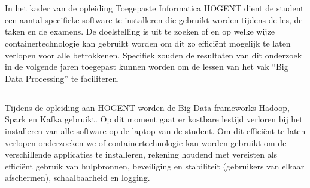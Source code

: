 
\chapter{}%
\label{ch:inleiding}

In het kader van de opleiding Toegepaste Informatica HOGENT dient de student een aantal specifieke software te installeren die gebruikt worden tijdens de les, de taken en de examens.
De doelstelling is uit te zoeken of en op welke wijze containertechnologie kan gebruikt worden om dit zo efficiënt mogelijk te laten verlopen voor alle betrokkenen. Specifiek zouden de resultaten van dit onderzoek in de volgende jaren toegepast kunnen worden om de lessen van het vak ``Big Data Processing'' te faciliteren.

\section{}%
\label{sec:probleemstelling}
Tijdens de opleiding aan HOGENT worden de Big Data frameworks Hadoop, Spark en Kafka gebruikt. Op dit moment gaat er kostbare lestijd verloren bij het installeren van alle software op de laptop van de student. Om dit efficiënt te laten verlopen onderzoeken we of containertechnologie kan worden gebruikt om de verschillende applicaties te installeren, rekening houdend met vereisten als efficiënt gebruik van hulpbronnen, beveiliging en stabiliteit (gebruikers van elkaar afschermen), schaalbaarheid en logging.


